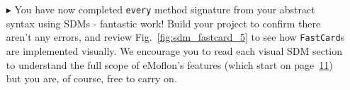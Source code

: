 \begin{itemize}
\vspace{0.5cm}

\item[$\blacktriangleright$] You have now completed \texttt{every} method signature from your abstract syntax using SDMs - fantastic work! Build your project to
confirm there aren't any errors, and review Fig.~\ref{fig:sdm_fastcard_5} to see how \texttt{FastCard}s are implemented visually. We encourage you to read each
visual SDM section to understand the full scope of eMoflon's features (which start on page~\hyperlink{page.11}{11}) but you are, of course, free to carry
on.
  
\end{itemize}
